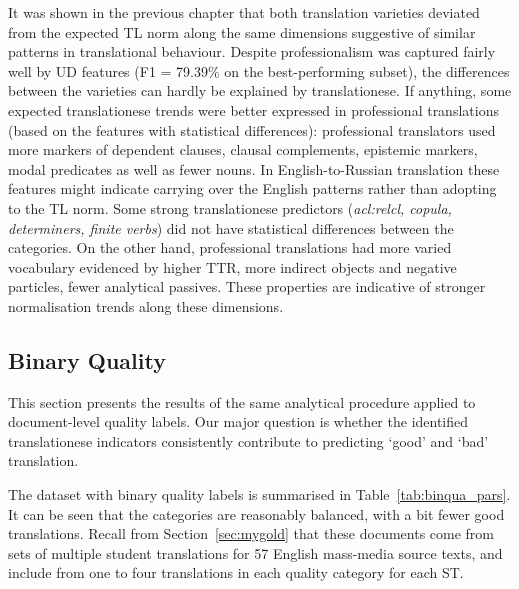 It was shown in the previous chapter that both translation varieties deviated from the expected TL norm along the same dimensions suggestive of similar patterns in translational behaviour. 
Despite professionalism was captured fairly well by UD features (F1 = 79.39\% on the best-performing subset), the differences between the varieties can hardly be explained by translationese.
\label{pg:more_professional_more_translated} If anything, some expected translationese trends were better expressed in professional translations (based on the features with statistical differences): professional translators used more markers of dependent clauses, clausal complements, epistemic markers, modal predicates as well as fewer nouns. %
In English-to-Russian translation these features might indicate carrying over the English patterns rather than adopting to the TL norm. %
Some strong translationese predictors (\textit{acl:relcl, copula, determiners, finite verbs}) did not have statistical differences between the categories.
On the other hand, professional translations had more varied vocabulary evidenced by higher TTR, more indirect objects and negative particles, fewer analytical passives. These properties are indicative of stronger normalisation trends along these dimensions.

\subsection{\label{ssec:bin}Binary Quality}
This section presents the results of the same analytical procedure applied to document-level quality labels. 
Our major question is whether the identified translationese indicators consistently contribute to predicting `good' and `bad' translation. 

The dataset with binary quality labels is summarised in Table~\ref{tab:binqua_pars}. It can be seen that the categories are reasonably balanced, with a bit fewer good translations. Recall from Section~\ref{sec:mygold} that these documents come from sets of multiple student translations for 57 English mass-media source texts, and include from one to four translations in each quality category for each ST.

